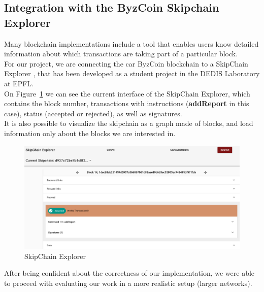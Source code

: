 \subsection{Integration with the ByzCoin Skipchain Explorer}
Many blockchain implementations include a tool that enables users know detailed information about which transactions are taking part of a particular block.\\
\newline
For our project, we are connecting the car ByzCoin blockchain to a SkipChain Explorer \cite{Skipchain Explorer}, that has been developed as a student project in the DEDIS Laboratory at EPFL.\\
\newline
On Figure~\ref{SkipChain Explorer} we can see the current interface of the SkipChain Explorer, which contains the block number, transactions with instructions (\textbf{addReport} in this case), status (accepted or rejected), as well as signatures.\\ 
\newline
It is also possible to visualize the skipchain as a graph made of blocks, and load information only about the blocks we are interested in.
\begin{figure}[H]
    \centering
    \includegraphics[width=1\textwidth]{Figures/SkipChain_Explorer.png}
    \caption{SkipChain Explorer}
    \label{SkipChain Explorer}
\end{figure}
\newline
\noindent
After being confident about the correctness of our implementation, we were able to proceed with evaluating our work in a more realistic setup (larger networks).